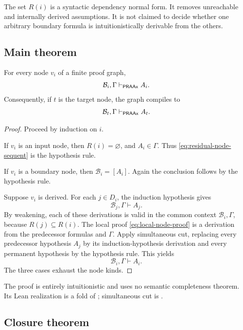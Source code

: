 \begin{remark}
The set \(R(i)\) is a syntactic dependency normal form.  It removes unreachable and internally derived assumptions.  It is not claimed to decide whether one arbitrary boundary formula is intuitionistically derivable from the others.
\end{remark}

\subsection{Main theorem}

\begin{theorem}\label{thm:residual-compilation}
For every node \(v_i\) of a finite proof graph,
\begin{equation}\label{eq:residual-node-sequent}
 \mathcal B_i,\Gamma\vdash_{\mathsf{PRAAx}} A_i.
\end{equation}
Consequently, if \(t\) is the target node, the graph compiles to
\[
 \mathcal B_t,\Gamma\vdash_{\mathsf{PRAAx}} A_t.
\]
\end{theorem}

\begin{proof}
Proceed by induction on \(i\).

If \(v_i\) is an input node, then \(R(i)=\varnothing\), and \(A_i\in\Gamma\).  Thus \eqref{eq:residual-node-sequent} is the hypothesis rule.

If \(v_i\) is a boundary node, then \(\mathcal B_i=[A_i]\).  Again the conclusion follows by the hypothesis rule.

Suppose \(v_i\) is derived.  For each \(j\in D_i\), the induction hypothesis gives
\[
 \mathcal B_j,\Gamma\vdash A_j.
\]
By weakening, each of these derivations is valid in the common context \(\mathcal B_i,\Gamma\), because \(R(j)\subseteq R(i)\).  The local proof \eqref{eq:local-node-proof} is a derivation from the predecessor formulas and \(\Gamma\).  Apply simultaneous cut, replacing every predecessor hypothesis \(A_j\) by its induction-hypothesis derivation and every permanent hypothesis by the hypothesis rule.  This yields
\[
 \mathcal B_i,\Gamma\vdash A_i.
\]
The three cases exhaust the node kinds.
\end{proof}

The proof is entirely intuitionistic and uses no semantic completeness theorem.  Its Lean realization is a fold of ; simultaneous cut is .

\subsection{Closure theorem}

